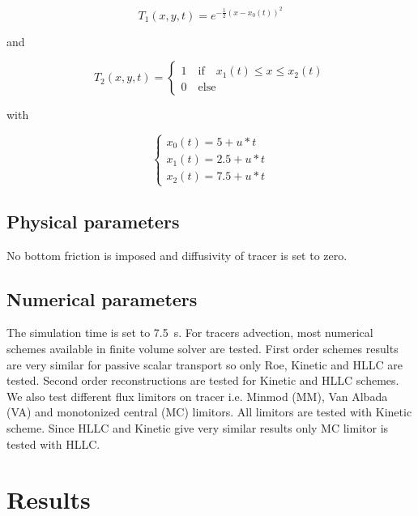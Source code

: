 \begin{equation*}
T_1(x,y,t)=e^{-\frac{1}{2}{(x-x_0(t))^2}}
\end{equation*}

and 

\begin{equation*}
T_2(x,y,t)=
\left\{
    \begin{array}{ll}
        1 \quad \text{if} \quad x_1(t) \leq x \leq x_2(t) \\
        0 \quad \text{else}
    \end{array}
\right.
\end{equation*}

with 

\begin{equation*}
\left\{
    \begin{array}{ll}
        x_0(t) = 5 + u*t \\
        x_1(t) = 2.5 + u*t \\
        x_2(t) = 7.5 + u*t
    \end{array}
\right.
\end{equation*}


\subsection{Physical parameters}

No bottom friction is imposed and diffusivity of tracer is set to zero.

\subsection{Numerical parameters}

The simulation time is set to 7.5~s.
For tracers advection, most numerical schemes available in  finite
volume solver are tested.
First order schemes results are very similar for passive scalar transport so
only Roe, Kinetic and HLLC are tested.
Second order reconstructions are tested for Kinetic and HLLC schemes.
We also test different flux limitors on tracer i.e. Minmod (MM), Van Albada (VA)
and monotonized central (MC) limitors.
All limitors are tested with Kinetic scheme.
Since HLLC and Kinetic give very similar results only MC limitor is tested with HLLC.

\section{Results}

